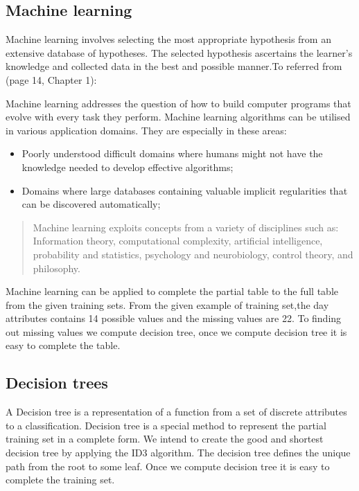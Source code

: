 \documentclass{article}
\begin{document}
\subsection{Machine learning}
\label{sec:machinelearn}

Machine learning involves selecting the most appropriate hypothesis from an extensive database of hypotheses. The selected hypothesis ascertains the learner's knowledge and collected data in the best and possible manner.To referred  from \cite{Mitchell1997MachineLearning}(page 14, Chapter 1):

Machine learning addresses the question of how to build computer programs that evolve with every task they perform. Machine learning algorithms can be utilised in various application domains. They are especially in these areas: 
\begin{itemize}
\item Poorly understood difficult domains where humans might not have the knowledge needed to develop effective algorithms;
\item Domains where large databases containing valuable implicit regularities that can be discovered automatically;
\end{itemize}

\begin{quote}
Machine learning exploits concepts from a variety of disciplines such as: Information theory, computational complexity, artificial intelligence, probability and statistics, psychology and neurobiology, control theory, and philosophy.
\end{quote}

Machine learning can be applied to complete the partial table to the full table from the given training sets. From the given example of training set,the day attributes contains 14 possible values and the missing values are 22. To finding out missing values we compute decision tree, once we compute decision tree it is easy to complete the table.

\subsection{Decision trees}
\label{sec:dectree}

A Decision tree is a representation of a function from a set of discrete attributes to a classification. Decision tree is a special method to represent the partial training set in a complete form. We intend to create the good and shortest decision tree by applying the ID3 algorithm.  The decision tree defines the unique path from the root to some leaf. Once we compute decision tree it is easy to complete the training set. 
\end{document}
